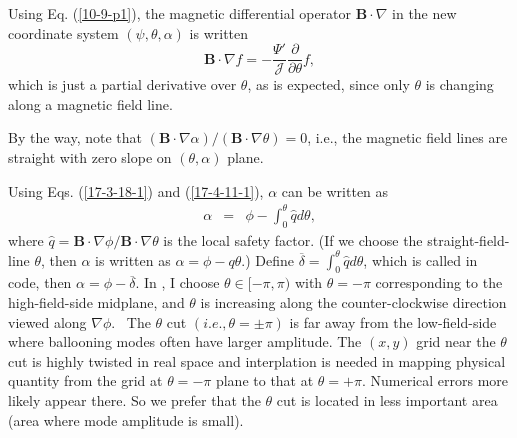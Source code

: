 \documentclass{llncs}
\newcommand{\tmtexttt}[1]{\text{{\ttfamily{#1}}}}
\begin{document}
Using Eq. (\ref{10-9-p1}), the magnetic differential operator $\mathbf{B}
\cdot \nabla$ in the new coordinate system $(\psi, \theta, \alpha)$ is written
\begin{equation}
  \label{10-25-e1} \mathbf{B} \cdot \nabla f = - \frac{\Psi'}{\mathcal{J}}
  \frac{\partial}{\partial \theta} f,
\end{equation}
which is just a partial derivative over $\theta$, as is expected, since only
$\theta$ is changing along a magnetic field line.

By the way, note that $(\mathbf{B} \cdot \nabla \alpha) / (\mathbf{B} \cdot
\nabla \theta) = 0$, i.e., the magnetic field lines are straight with zero
slope on $(\theta, \alpha)$ plane.

Using Eqs. (\ref{17-3-18-1}) and (\ref{17-4-11-1}), $\alpha$ can be written as
\begin{eqnarray}
  \alpha & = & \phi - \int_0^{\theta} \hat{q} d \theta,  \label{17-9-15-1}
\end{eqnarray}
where $\hat{q} =\mathbf{B} \cdot \nabla \phi /\mathbf{B} \cdot \nabla \theta$
is the local safety factor. (If we choose the straight-field-line $\theta$,
then $\alpha$ is written as $\alpha = \phi - q \theta$.) Define
$\overline{\delta} = \int_0^{\theta} \hat{q} d \theta$, which is called
\tmtexttt{tor\_shift} in \tmtexttt{TEK} code, then $\alpha = \phi -
\overline{\delta}$. In \tmtexttt{TEK}, I choose $\theta \in [- \pi, \pi)$ with
$\theta = - \pi$ corresponding to the high-field-side midplane, and $\theta$
is increasing along the counter-clockwise direction viewed along $\nabla
\phi$. \ The $\theta$ cut $(i.e., \theta = \pm \pi)$ is far away from the
low-field-side where ballooning modes often have larger amplitude. The $(x,
y)$ grid near the $\theta$ cut is highly twisted in real space and
interplation is needed in mapping physical quantity from the grid at $\theta =
- \pi$ plane to that at $\theta = + \pi$. Numerical errors more likely appear
there. So we prefer that the $\theta$ cut is located in less important area
(area where mode amplitude is small).
\end{document}
